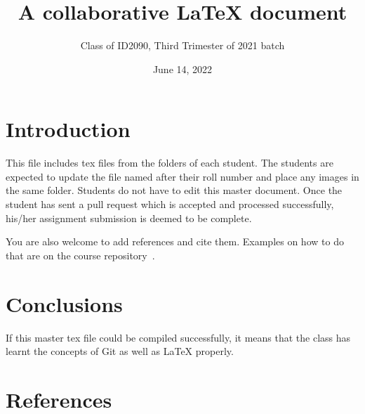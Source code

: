 \documentclass[12pt,a4paper]{article}
\author{Class of ID2090, Third Trimester of 2021 batch}
\title{A collaborative LaTeX document}
\date{June 14, 2022}
\begin{document}
\maketitle

\tableofcontents
\listoffigures
\listoftables

\section{Introduction}

This file includes tex files from the folders of each student. The students are expected to update the file named after their roll number and place any images in the same folder. Students do not have to edit this master document. Once the student has sent a pull request which is accepted and processed successfully, his/her assignment submission is deemed to be complete. 

You are also welcome to add references and cite them. Examples on how to do that are on the course repository~\cite{id2090}.














































\section{Conclusions}

If this master tex file could be compiled successfully, it means that the class has learnt the concepts of Git as well as LaTeX properly.

\section{References}


\end{document}
